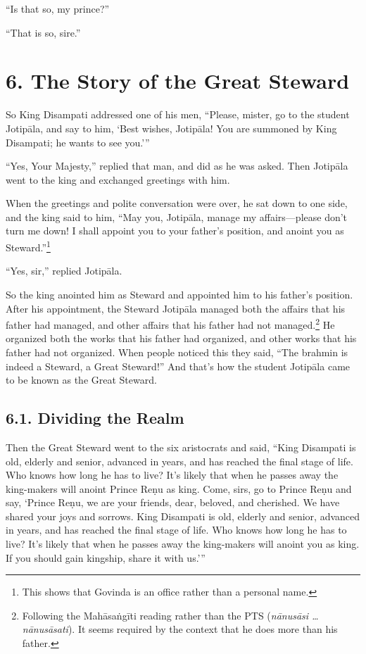 \documentclass[12pt,openany]{book}%
\begin{document}
“Is that so, my prince?” 

“That is so, sire.” 

\section*{6. The Story of the Great Steward }

So King Disampati addressed one of his men, “Please, mister, go to the student \textsanskrit{Jotipāla}, and say to him, ‘Best wishes, \textsanskrit{Jotipāla}! You are summoned by King Disampati; he wants to see you.’” 

“Yes, Your Majesty,” replied that man, and did as he was asked. Then \textsanskrit{Jotipāla} went to the king and exchanged greetings with him. 

When the greetings and polite conversation were over, he sat down to one side, and the king said to him, “May you, \textsanskrit{Jotipāla}, manage my affairs—please don’t turn me down! I shall appoint you to your father’s position, and anoint you as Steward.”\footnote{This shows that Govinda is an office rather than a personal name. } 

“Yes, sir,” replied \textsanskrit{Jotipāla}. 

So the king anointed him as Steward and appointed him to his father’s position. After his appointment, the Steward \textsanskrit{Jotipāla} managed both the affairs that his father had managed, and other affairs that his father had not managed.\footnote{Following the \textsanskrit{Mahāsaṅgīti} reading rather than the PTS (\textit{\textsanskrit{nānusāsi} … \textsanskrit{nānusāsati}}). It seems required by the context that he does more than his father. } He organized both the works that his father had organized, and other works that his father had not organized. When people noticed this they said, “The brahmin is indeed a Steward, a Great Steward!” And that’s how the student \textsanskrit{Jotipāla} came to be known as the Great Steward. 

\subsection*{6.1. Dividing the Realm }

Then the Great Steward went to the six aristocrats and said, “King Disampati is old, elderly and senior, advanced in years, and has reached the final stage of life. Who knows how long he has to live? It’s likely that when he passes away the king-makers will anoint Prince \textsanskrit{Reṇu} as king. Come, sirs, go to Prince \textsanskrit{Reṇu} and say, ‘Prince \textsanskrit{Reṇu}, we are your friends, dear, beloved, and cherished. We have shared your joys and sorrows. King Disampati is old, elderly and senior, advanced in years, and has reached the final stage of life. Who knows how long he has to live? It’s likely that when he passes away the king-makers will anoint you as king. If you should gain kingship, share it with us.’” 
\end{document}
